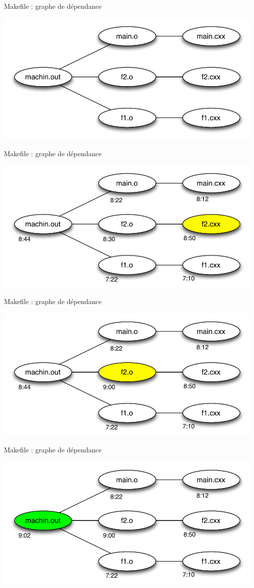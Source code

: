 \begin{frame}{Makefile : graphe de dépendance}
    \begin{center}
        \includegraphics[width=.7\textwidth]{fig/base-dependance.pdf}
    \end{center}
\end{frame}
\begin{frame}{Makefile : graphe de dépendance}
    \begin{center}
        \includegraphics[width=.7\textwidth]{fig/base-dependance1.pdf}
    \end{center}
\end{frame}
\begin{frame}{Makefile : graphe de dépendance}
    \begin{center}
        \includegraphics[width=.7\textwidth]{fig/base-dependance2.pdf}
    \end{center}
\end{frame}
\begin{frame}{Makefile : graphe de dépendance}
    \begin{center}
        \includegraphics[width=.7\textwidth]{fig/base-dependance3.pdf}
    \end{center}
\end{frame}


